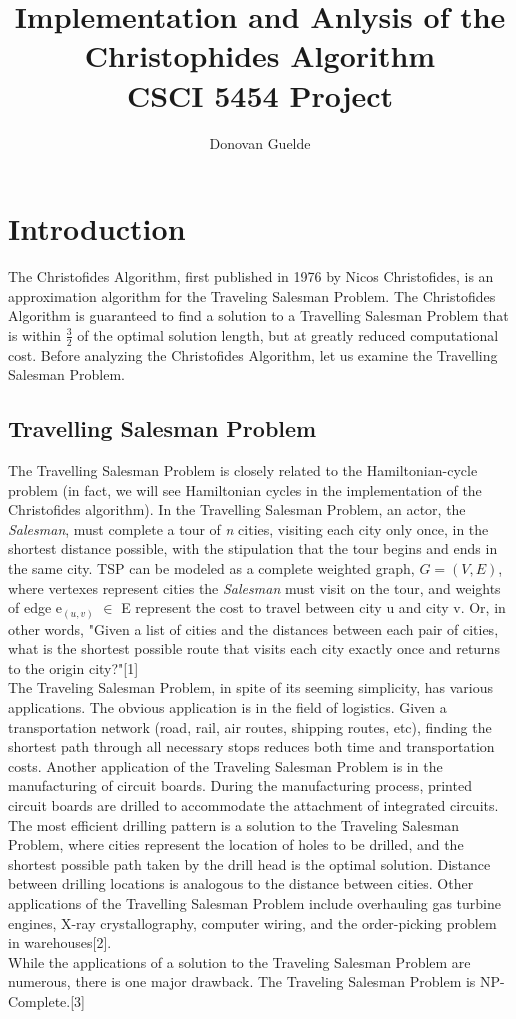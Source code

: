 \documentclass[12pt, oneside]{article}   	%
\title{Implementation and Anlysis of the Christophides Algorithm\\CSCI 5454 Project}
\author{Donovan Guelde}
\date{}							%
\begin{document}
\maketitle
\newpage
\section{Introduction}
\indent\indent The Christofides Algorithm, first published in 1976 by Nicos Christofides, is an approximation algorithm for the Traveling Salesman Problem.  The Christofides Algorithm is guaranteed to find a solution to a Travelling Salesman Problem that is within $\frac{3}{2}$ of the optimal solution length, but at greatly reduced computational cost.  Before analyzing the Christofides Algorithm, let us examine the Travelling Salesman Problem.\\
\subsection{Travelling Salesman Problem}
\indent\indent The Travelling Salesman Problem is closely related to the Hamiltonian-cycle problem (in fact, we will see Hamiltonian cycles in the implementation of the Christofides algorithm).  In the Travelling Salesman Problem, an actor, the \textit{Salesman}, must complete a tour of \textit{n} cities, visiting each city only once, in the shortest distance possible, with the stipulation that the tour begins and ends in the same city.  TSP can be modeled as a complete weighted graph, $G=(V,E)$, where vertexes represent cities the \textit{Salesman} must visit on the tour, and weights of edge e$_{(u,v)}$ $\in$ E represent the cost to travel between city u and city v.  Or, in other words, "Given a list of cities and the distances between each pair of cities, what is the shortest possible route that visits each city exactly once and returns to the origin city?"[1]\\
\indent The Traveling Salesman Problem, in spite of its seeming simplicity, has various applications.  The obvious application is in the field of logistics.  Given a transportation network (road, rail, air routes, shipping routes, etc), finding the shortest path through all necessary stops reduces both time and transportation costs.  Another application of the Traveling Salesman Problem is in the manufacturing of circuit boards.  During the manufacturing process, printed circuit boards are drilled to accommodate the attachment of integrated circuits.  The most efficient drilling pattern is a solution to the Traveling Salesman Problem, where cities represent the location of holes to be drilled, and the shortest possible path taken by the drill head is the optimal solution.  Distance between drilling locations is analogous to the distance between cities.  Other applications of the Travelling Salesman Problem include overhauling gas turbine engines, X-ray crystallography, computer wiring, and the order-picking problem in warehouses[2].\\
\indent While the applications of a solution to the Traveling Salesman Problem are numerous, there is one major drawback.  The Traveling Salesman Problem is NP-Complete.[3]\\
\end{document}
